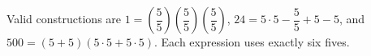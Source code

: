 Valid constructions are $\boxed{1=(\dfrac{5}{5})(\dfrac{5}{5})(\dfrac{5}{5})}$, $\boxed{24=5\cdot5-\dfrac{5}{5}+5-5}$, and $\boxed{500=(5+5)(5\cdot5+5\cdot5)}$. Each expression uses exactly six fives.
